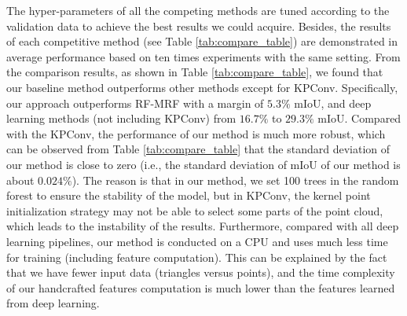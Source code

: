The hyper-parameters of all the competing methods are tuned \textcolor{ao}{according to the validation data} to achieve the best results we could acquire.  
Besides, the results of each competitive method (see Table \ref{tab:compare_table}) are demonstrated in average performance based on ten times experiments with the same setting. 
From the comparison results, as shown in Table \ref{tab:compare_table}, we found that our baseline method outperforms other methods except for KPConv.
Specifically, our approach outperforms RF-MRF with a margin of $5.3\%$ mIoU, and deep learning methods (not including KPConv) from $16.7\%$ to $29.3\%$ mIoU.
Compared with the KPConv, the performance of our method is much more robust, which can be observed from Table \ref{tab:compare_table} that the standard deviation of our method is close to zero (i.e., the standard deviation of mIoU of our method is about $0.024\%$).  
The reason is that in our method, we set 100 trees in the random forest to ensure the stability of the model, but in KPConv, the kernel point initialization strategy may not be able to select some parts of the point cloud, which leads to the instability of the results.
Furthermore, compared with all deep learning pipelines, our method is conducted on a CPU and uses much less time for training (including feature computation).
This can be explained by the fact that we have fewer input data (triangles versus points), and the time complexity of our handcrafted features computation is much lower than the features learned from deep learning.

